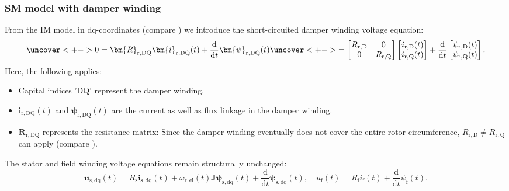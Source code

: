 \begin{frame}
	\frametitle{SM model with damper winding}
	From the IM model in dq-coordinates (compare ) we introduce the short-circuited damper winding voltage equation:
	\begin{equation}
		\uncover<+->{
				0 = \bm{R}_{\mathrm{r,DQ}} \bm{i}_{\mathrm{r,DQ}}(t) + \frac{\mathrm{d}}{\mathrm{d}t}\bm{\psi}_{\mathrm{r,DQ}}(t)} \uncover<+->{= \begin{bmatrix}
					R_\mathrm{r,D} & 0 \\ 0 & R_\mathrm{r,Q}
				\end{bmatrix} \begin{bmatrix}
					i_{\mathrm{r,D}}(t) \\ i_{\mathrm{r,Q}}(t)
				\end{bmatrix} + \frac{\mathrm{d}}{\mathrm{d}t} \begin{bmatrix}
					\psi_{\mathrm{r,D}}(t) \\ \psi_{\mathrm{r,Q}}(t)
				\end{bmatrix}.}
		\label{eq:damper_winding_voltage}
	\end{equation}
	\onslide<+->
	Here, the following applies:
	\begin{itemize}
		\item<+-> Capital indices 'DQ' represent the damper winding.
		\item<+-> $\bm{i}_{\mathrm{r,DQ}}(t)$ and $\bm{\psi}_{\mathrm{r,DQ}}(t)$ are the current as well as flux linkage in the damper winding.
		\item<+-> $\bm{R}_{\mathrm{r,DQ}}$ represents the resistance matrix: Since the damper winding eventually does not cover the entire rotor circumference, $R_\mathrm{r,D}\neq R_\mathrm{r,Q}$ can apply (compare ).
	\end{itemize}
	\onslide<+->
	The stator and field winding voltage equations remain structurally unchanged:
	$$\bm{u}_\mathrm{s,dq}(t) = R_\mathrm{s} \bm{i}_\mathrm{s,dq}(t)+ \omega_\mathrm{r,el}(t)\bm{J}\bm{\psi}_\mathrm{s,dq}(t) + \frac{\mathrm{d}}{\mathrm{d}t}\bm{\psi}_\mathrm{s,dq}(t), \quad u_\mathrm{f}(t) = R_\mathrm{f}i_\mathrm{f}(t)+\frac{\mathrm{d}}{\mathrm{d}t}\psi_\mathrm{f}(t).$$
\end{frame}


